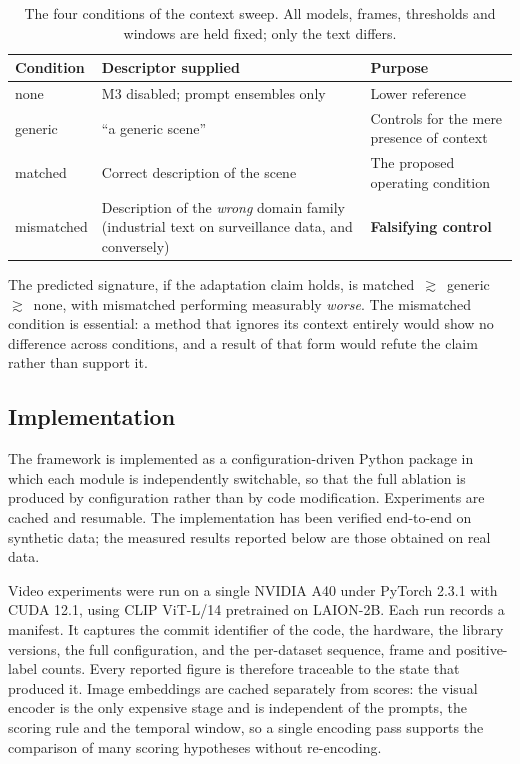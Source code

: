 \documentclass[a4paper,fleqn]{cas-sc}
\begin{document}
\begin{table}[width=\linewidth,cols=3,pos=h]
\caption{The four conditions of the context sweep. All models, frames,
thresholds and windows are held fixed; only the text differs.}
\label{tbl:variants}
\begin{tabularx}{\linewidth}{@{}l Z Z@{}}
\toprule
\textbf{Condition} & \textbf{Descriptor supplied} & \textbf{Purpose} \\
\midrule
none       & M3 disabled; prompt ensembles only & Lower reference \\
generic    & ``a generic scene''                & Controls for the mere presence of context \\
matched    & Correct description of the scene   & The proposed operating condition \\
mismatched & Description of the \emph{wrong} domain family (industrial text on surveillance data, and conversely) & \textbf{Falsifying control} \\
\bottomrule
\end{tabularx}
\end{table}

The predicted signature, if the adaptation claim holds, is
matched~$\gtrsim$~generic~$\gtrsim$~none, with mismatched performing measurably
\emph{worse}. The mismatched condition is essential: a method that ignores its
context entirely would show no difference across conditions, and a result of that
form would refute the claim rather than support it.

\subsection{Implementation}
The framework is implemented as a configuration-driven Python package in which
each module is independently switchable, so that the full ablation is produced by
configuration rather than by code modification. Experiments are cached and
resumable. The implementation has been verified end-to-end on synthetic data; the
measured results reported below are those obtained on real data.

Video experiments were run on a single NVIDIA A40 under PyTorch 2.3.1 with CUDA
12.1, using CLIP ViT-L/14 pretrained on LAION-2B. Each run records a manifest. It captures the
commit identifier of the code, the hardware, the library versions, the full
configuration, and the per-dataset sequence, frame and positive-label counts.
Every reported figure is therefore traceable to the state that produced it. Image embeddings are cached separately from scores: the visual encoder is
the only expensive stage and is independent of the prompts, the scoring rule and
the temporal window, so a single encoding pass supports the comparison of many
scoring hypotheses without re-encoding.
\end{document}
